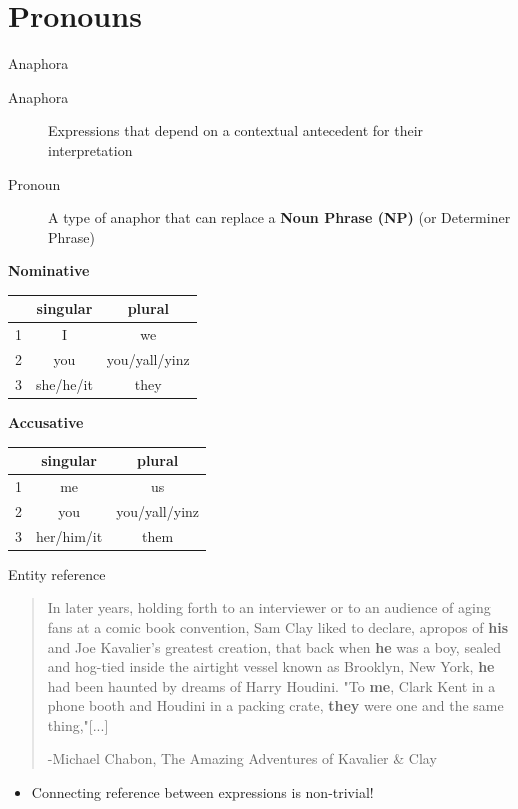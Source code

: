\documentclass[10pt, compress]{beamer}
\begin{document}
\section{Pronouns}
\begin{frame}{Anaphora}
	\begin{description}
		\item[Anaphora] Expressions that depend on a contextual antecedent for their interpretation
		\item[Pronoun] A type of anaphor that can replace a \textbf{Noun Phrase (NP)} (or Determiner Phrase)
	\end{description}

	\begin{table}
		\begin{multicols}{2}

			{\bf Nominative}	\\
			\begin{tabular}{|r|cc|}
				\toprule
					&	singular	&	plural	\\
				\midrule
				1	&	I 	&	we 	\\
				2	&	you 	&	you/yall/yinz 	\\
				3	&	she/he/it &	they 	\\
				\bottomrule
			\end{tabular}

			{\bf Accusative}	\\
			\begin{tabular}{|r|cc|}
				\toprule
					&	singular	&	plural	\\
				\midrule
				1	&	me 	&	us 	\\
				2	&	you 	&	you/yall/yinz 	\\
				3	&	her/him/it &	them 	\\
				\bottomrule
			\end{tabular}
		\end{multicols}
	\end{table}
\end{frame}

\begin{frame}{Entity reference}
	\begin{quote}
		In later years, holding forth to an interviewer or to an audience of aging fans at a comic book convention, Sam Clay liked to declare, apropos of \textbf{his} and Joe Kavalier's greatest creation, that back when \textbf{he} was a boy, sealed and hog-tied inside the airtight vessel known as Brooklyn, New York, \textbf{he} had been haunted by dreams of Harry Houdini. "To \textbf{me}, Clark Kent in a phone booth and Houdini in a packing crate, \textbf{they} were one and the same thing,"[...]

		\medskip
		-Michael Chabon, The Amazing Adventures of Kavalier \& Clay
	\end{quote}

	\pause

	\begin{itemize}
		\item Connecting reference between expressions is non-trivial!
	\end{itemize}
\end{frame}
\end{document}
